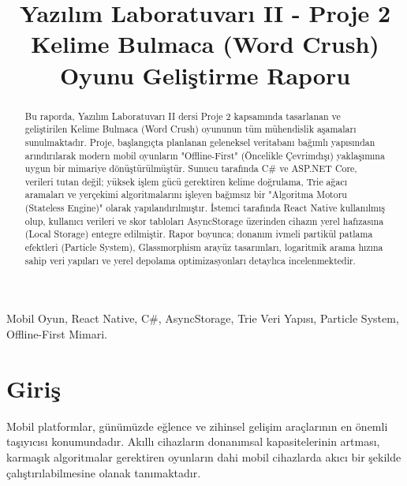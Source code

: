 \documentclass[conference,a4paper]{IEEEtran}
\begin{document}
\shorthandoff{=}

\title{Yazılım Laboratuvarı II - Proje 2\\Kelime Bulmaca (Word Crush) Oyunu Geliştirme Raporu}

\author{
}

\maketitle

\begin{abstract}
Bu raporda, Yazılım Laboratuvarı II dersi Proje 2 kapsamında tasarlanan ve geliştirilen Kelime Bulmaca (Word Crush) oyununun tüm mühendislik aşamaları sunulmaktadır. Proje, başlangıçta planlanan geleneksel veritabanı bağımlı yapısından arındırılarak modern mobil oyunların "Offline-First" (Öncelikle Çevrimdışı) yaklaşımına uygun bir mimariye dönüştürülmüştür. Sunucu tarafında C\# ve ASP.NET Core, verileri tutan değil; yüksek işlem gücü gerektiren kelime doğrulama, Trie ağacı aramaları ve yerçekimi algoritmalarını işleyen bağımsız bir "Algoritma Motoru (Stateless Engine)" olarak yapılandırılmıştır. İstemci tarafında React Native kullanılmış olup, kullanıcı verileri ve skor tabloları AsyncStorage üzerinden cihazın yerel hafızasına (Local Storage) entegre edilmiştir. Rapor boyunca; donanım ivmeli partikül patlama efektleri (Particle System), Glassmorphism arayüz tasarımları, logaritmik arama hızına sahip veri yapıları ve yerel depolama optimizasyonları detaylıca incelenmektedir.
\end{abstract}

\begin{IEEEkeywords}
Mobil Oyun, React Native, C\#, AsyncStorage, Trie Veri Yapısı, Particle System, Offline-First Mimari.
\end{IEEEkeywords}

\section{Giriş}
Mobil platformlar, günümüzde eğlence ve zihinsel gelişim araçlarının en önemli taşıyıcısı konumundadır. Akıllı cihazların donanımsal kapasitelerinin artması, karmaşık algoritmalar gerektiren oyunların dahi mobil cihazlarda akıcı bir şekilde çalıştırılabilmesine olanak tanımaktadır. 
\end{document}
